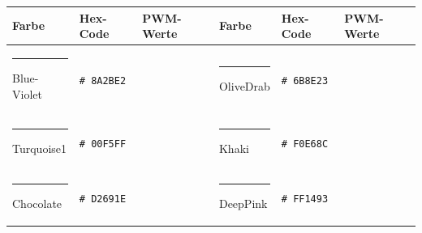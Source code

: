 \begin{table}[H]
	\centering
	\begin{minipage}[c]{\textwidth}
		\begin{tabu} to \textwidth {X[L,2]X[L]X[L]|X[L,2]X[L]X[L]}
			\toprule
			\textbf{Farbe} & \textbf{Hex-Code} & \textbf{PWM-Werte} & \textbf{Farbe} & \textbf{Hex-Code} & \textbf{PWM-Werte} \\
			\midrule
			\textcolor{blueviolet}{\rule{1cm}{0.4cm}} Blue-Violet	& \texttt{\# 8A2BE2} &  & \textcolor{olivedrab}{\rule{1cm}{0.4cm}} OliveDrab & \texttt{\# 6B8E23} &  \\ 
			\textcolor{turquoise1}{\rule{1cm}{0.4cm}} Turquoise1	& \texttt{\# 00F5FF} &  & \textcolor{khaki}{\rule{1cm}{0.4cm}} Khaki & \texttt{\# F0E68C} &  \\
			\textcolor{chocolate}{\rule{1cm}{0.4cm}} Chocolate	& \texttt{\# D2691E} &  & \textcolor{deeppink}{\rule{1cm}{0.4cm}} DeepPink & \texttt{\# FF1493} &  \\
			\bottomrule
		\end{tabu}
	\end{minipage}
	\label{tab:rgb-codes}
\end{table}

